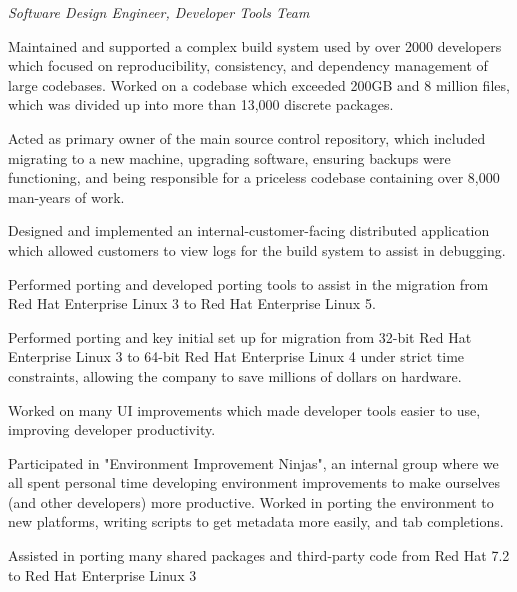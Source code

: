 \documentclass[margin,line]{resume}
\begin{document}
\begin{resume}
    \vspace{1mm} \vspace{1mm}%
    {\sl Software Design Engineer, Developer Tools Team} \\%
    \begin{list2}
        \vspace*{1mm}
        \item
          Maintained and supported a complex build system used by over 2000 developers
          which focused on reproducibility, consistency, and dependency management of
          large codebases.  Worked on a codebase which exceeded 200GB and 8 million
          files, which was divided up into more than 13,000 discrete packages.
        \item
          Acted as primary owner of the main source control repository, which included
          migrating to a new machine, upgrading software, ensuring backups were
          functioning, and being responsible for a priceless codebase containing over
          8,000 man-years of work.
        \item
          Designed and implemented an internal-customer-facing distributed application
          which allowed customers to view logs for the build system to assist in
          debugging.
        \item
          Performed porting and developed porting tools to assist in the migration from
          Red Hat Enterprise Linux 3 to Red Hat Enterprise Linux 5.
        \item
          Performed porting and key initial set up for migration from 32-bit Red Hat
          Enterprise Linux 3 to 64-bit Red Hat Enterprise Linux 4 under strict time
          constraints, allowing the company to save millions of dollars on hardware.
        \item
          Worked on many UI improvements which made developer tools easier to use,
          improving developer productivity.
        \item
          Participated in "Environment Improvement Ninjas", an internal group where we
          all spent personal time developing environment improvements to make ourselves
          (and other developers) more productive.  Worked in porting the environment to
          new platforms, writing scripts to get metadata more easily, and tab
          completions.
        \item
          Assisted in porting many shared packages and third-party code from Red Hat 7.2
          to Red Hat Enterprise Linux 3
    \end{list2}


\end{resume}
\end{document}
